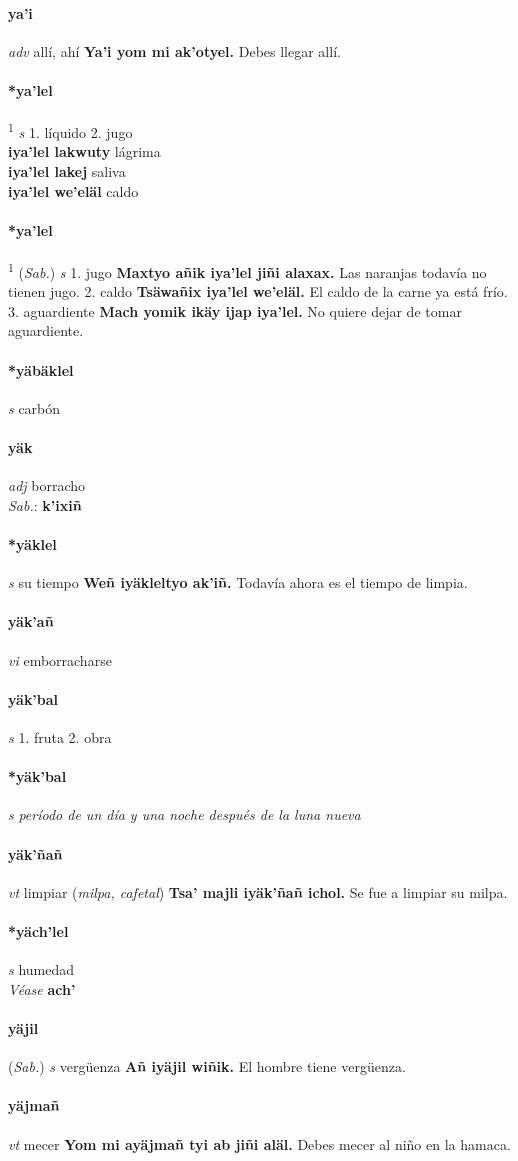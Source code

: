 \documentclass{scrbook}
\newcommand{\entry}[1]{\paragraph{#1}}
\newcommand{\onedefinition}[1]{#1.}
\newcommand{\defsuperscript}[1]{\textsuperscript{1}}
\newcommand{\nontranslationdef}[1]{\textit{#1}}
\newcommand{\partofspeech}[1]{\textit{#1}}
\newcommand{\spanishtranslation}[1]{#1}
\newcommand{\clarification}[1]{(\textit{#1})}
\newcommand{\cholexample}[1]{\textbf{#1}}
\newcommand{\exampletranslation}[1]{#1}
\newcommand{\dialectvariant}[1]{\\\textit{#1}:}
\newcommand{\dialectword}[1]{\textbf{#1}}
\newcommand{\alsosee}[1]{\\\textit{Véase} \textbf{#1}}
\newcommand{\relevantdialect}[1]{(\textit{#1})}
\newcommand{\secondaryentry}[1]{\\\textbf{#1}}
\newcommand{\secondtranslation}[1]{#1}
\begin{document}
\begin{multicols}{2}
\entry{ya'i}
\partofspeech{adv}
\spanishtranslation{allí, ahí}
\cholexample{Ya'i yom mi ak'otyel.}
\exampletranslation{Debes llegar allí.}

\entry{*ya'lel}
\defsuperscript{1}
\partofspeech{s}
\onedefinition{1}
\spanishtranslation{líquido}
\onedefinition{2}
\spanishtranslation{jugo}
\secondaryentry{iya'lel lakwuty}
\secondtranslation{lágrima}
\secondaryentry{iya'lel lakej}
\secondtranslation{saliva}
\secondaryentry{iya'lel we'eläl}
\secondtranslation{caldo}

\entry{*ya'lel}
\defsuperscript{2}
\relevantdialect{Sab.}
\partofspeech{s}
\onedefinition{1}
\spanishtranslation{jugo}
\cholexample{Maxtyo añik iya'lel jiñi alaxax.}
\exampletranslation{Las naranjas todavía no tienen jugo.}
\onedefinition{2}
\spanishtranslation{caldo}
\cholexample{Tsäwañix iya'lel we'eläl.}
\exampletranslation{El caldo de la carne ya está frío.}
\onedefinition{3}
\spanishtranslation{aguardiente}
\cholexample{Mach yomik ikäy ijap iya'lel.}
\exampletranslation{No quiere dejar de tomar aguardiente.}

\entry{*yäbäklel}
\partofspeech{s}
\spanishtranslation{carbón}

\entry{yäk}
\partofspeech{adj}
\spanishtranslation{borracho}
\dialectvariant{Sab.}
\dialectword{k'ixiñ}

\entry{*yäklel}
\partofspeech{s}
\spanishtranslation{su tiempo}
\cholexample{Weñ iyäkleltyo ak'iñ.}
\exampletranslation{Todavía ahora es el tiempo de limpia.}

\entry{yäk'añ}
\partofspeech{vi}
\spanishtranslation{emborracharse}

\entry{yäk'bal}
\partofspeech{s}
\onedefinition{1}
\spanishtranslation{fruta}
\onedefinition{2}
\spanishtranslation{obra}

\entry{*yäk'bal}
\partofspeech{s}
\nontranslationdef{período de un día y una noche después de la luna nueva}

\entry{yäk'ñañ}
\partofspeech{vt}
\spanishtranslation{limpiar}
\clarification{milpa, cafetal}
\cholexample{Tsa' majli iyäk'ñañ ichol.}
\exampletranslation{Se fue a limpiar su milpa.}

\entry{*yäch'lel}
\partofspeech{s}
\spanishtranslation{humedad}
\alsosee{ach'}

\entry{yäjil}
\relevantdialect{Sab.}
\partofspeech{s}
\spanishtranslation{vergüenza}
\cholexample{Añ iyäjil wiñik.}
\exampletranslation{El hombre tiene vergüenza.}

\entry{yäjmañ}
\partofspeech{vt}
\spanishtranslation{mecer}
\cholexample{Yom mi ayäjmañ tyi ab jiñi aläl.}
\exampletranslation{Debes mecer al niño en la hamaca.}


\end{multicols}
\end{document}
